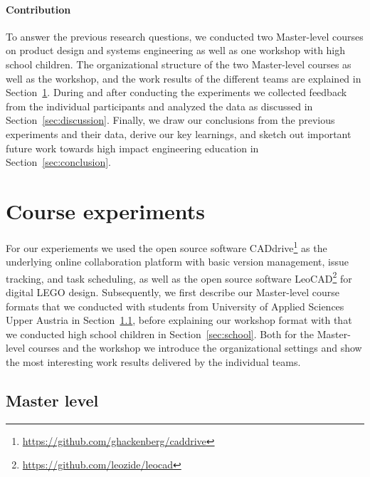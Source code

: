 \documentclass{PDS}
\begin{document}
\paragraph{Contribution}

To answer the previous research questions, we conducted two Master-level courses on product design and systems engineering as well as one workshop with high school children.
The organizational structure of the two Master-level courses as well as the workshop, and the work results of the different teams are explained in Section~\ref{sec:contribution}.
During and after conducting the experiments we collected feedback from the individual participants and analyzed the data as discussed in Section~\ref{sec:discussion}.
Finally, we draw our conclusions from the previous experiments and their data, derive our key learnings, and sketch out important future work towards high impact engineering education in Section~\ref{sec:conclusion}.

\section{Course experiments}
\label{sec:contribution}

For our experiements we used the open source software CADdrive\footnote{\url{https://github.com/ghackenberg/caddrive}} as the underlying online collaboration platform with basic version management, issue tracking, and task scheduling, as well as the open source software LeoCAD\footnote{\url{https://github.com/leozide/leocad}} for digital LEGO design.
Subsequently, we first describe our Master-level course formats that we conducted with students from University of Applied Sciences Upper Austria in Section~\ref{sec:master}, before explaining our workshop format with that we conducted high school children in Section~\ref{sec:school}.
Both for the Master-level courses and the workshop we introduce the organizational settings and show the most interesting work results delivered by the individual teams.

\subsection{Master level}
\label{sec:master}
\end{document}
